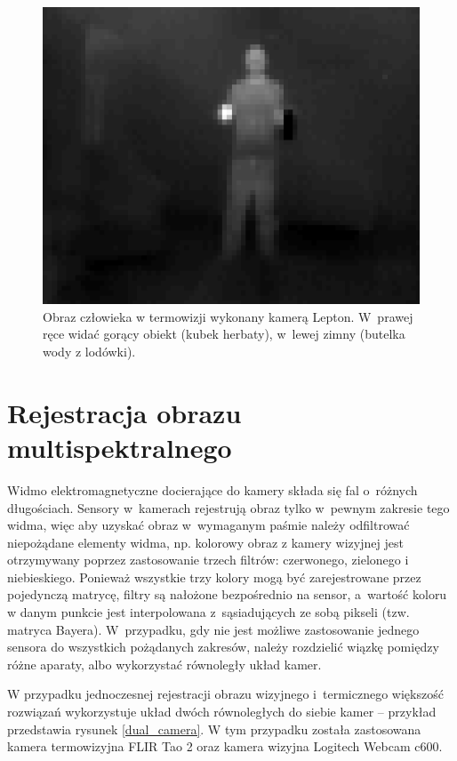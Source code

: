 \begin{figure}
\centering
\includegraphics[width=0.5\linewidth]{images/leptonTermalImage.png}
\caption[Obraz człowieka w~termowizji wykonany kamerą Lepton.]{Obraz człowieka w termowizji wykonany kamerą Lepton. W~prawej ręce widać gorący obiekt (kubek herbaty), w~lewej zimny (butelka wody z lodówki).}
\label{fig:leptonTermalImage}
\end{figure}



\section{Rejestracja obrazu multispektralnego}

Widmo elektromagnetyczne docierające do kamery składa się fal o~różnych długościach. 
Sensory w~kamerach rejestrują obraz tylko w~pewnym zakresie tego widma, więc aby uzyskać obraz w~wymaganym paśmie należy odfiltrować niepożądane elementy widma, np. kolorowy obraz z kamery wizyjnej jest otrzymywany poprzez zastosowanie trzech filtrów: czerwonego, zielonego i niebieskiego. 
Ponieważ wszystkie trzy kolory mogą być zarejestrowane przez pojedynczą matrycę, filtry są nałożone bezpośrednio na sensor, a~wartość koloru w danym punkcie jest interpolowana z~sąsiadujących ze sobą pikseli (tzw. matryca Bayera). 
W~przypadku, gdy nie jest możliwe zastosowanie jednego sensora do wszystkich pożądanych zakresów, należy rozdzielić wiązkę pomiędzy różne aparaty, albo wykorzystać równoległy układ kamer. %

W przypadku jednoczesnej rejestracji obrazu wizyjnego i~termicznego większość rozwiązań wykorzystuje układ dwóch równoległych do siebie kamer -- przykład przedstawia rysunek \ref{dual_camera}. 
W tym przypadku została zastosowana kamera termowizyjna FLIR Tao 2 oraz kamera wizyjna Logitech Webcam c600. 

